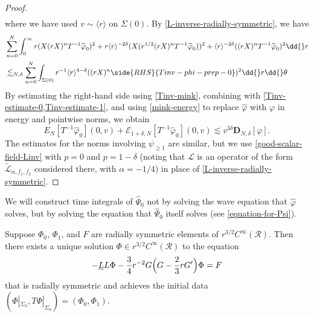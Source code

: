 \documentclass[10pt, reqno]{amsart}
\begin{document}
\begin{proof}
\begin{equation}
\begin{split}
\end{split}
\end{equation}
where we have used \(v\sim \langle{}r\rangle{}\) on \(\Sigma{}(0)\). By \cref{L-inverse-radially-symmetric}, we have
\begin{equation}\label{Tinv-Linv-prep-0}
\begin{split}
&\sum_{n=0}^N\int_0^\infty r(X(rX)^nT^{-1}\widehat{\varphi{}}_0)^2 + r\langle{}r\rangle{}^{-2\delta{}}(X(r^{1/2}(rX)^nT^{-1}\widehat{\varphi{}}_0))^2 + \langle{}r\rangle^{-2\delta{}}((rX)^nT^{-1}\widehat{\varphi{}}_0)^2 \dd{}r  \\
&\lesssim_{N,\delta{}} \sum_{n=0}^N \int _{\Sigma{}(0)} r^{-1}\langle{}r\rangle^{4-\delta{}}((rX)^n\side{RHS}{Tinv-phi-prep-0})^2\dd{}r\dd{}\theta{}
\end{split}
\end{equation}
By estimating the right-hand side using \cref{Tinv-mink}, combining with
\cref{Tinv-estimate-0,Tinv-estimate-1}, and using \cref{mink-energy} to replace
\(\widehat{\varphi{}}\) with \(\varphi{}\) in energy and pointwise norms, we obtain
\begin{equation}
E_N[T^{-1}\widehat{\varphi{}}_0](0,v) + \mathcal{E}_{1+\delta{},N}[T^{-1}\widehat{\varphi{}}_{0}](0,v) \lesssim v^{3\delta{}}\mathbf{D}_{N,\delta{}}[\varphi{}].
\end{equation}
The estimates for the norms involving \(\psi_{\ge 1}\) are similar, but we use
\cref{good-scalar-field-Linv} with \(p = 0\) and \(p = 1-\delta{}\) (noting that
\(\mathcal{L}\) is an operator of the form
\(\tilde{\mathcal{L}}_{\alpha{},f_1,f_2}\) considered there, with \(\alpha{} =
-1/4\)) in place of \cref{L-inverse-radially-symmetric}.
\end{proof}
We will construct time integrals of \(\widehat{\Psi{}}_0\) not by solving the wave
equation that \(\widehat{\varphi{}}\) solves, but by solving the equation that \(\widehat{\Psi{}}_0\) itself solves (see
\cref{equation-for-Psi}).
\begin{lemma}
Suppose \(\Phi{}_0\), \(\Phi{}_1\), and \(F\) are radially symmetric elements of \(r^{3/2}C^\infty(\mathcal{R})\). Then there exists a
unique solution \(\Phi{}\in r^{3/2}C^\infty(\mathcal{R})\) to the equation
\begin{equation}\label{Psi-equation-existence-equation}
-\underline{L}L\Phi{} - \frac{3}{4}r^{-2}G\Bigl(G - \frac{2}{3}rG'\Bigr)\Phi{} = F
\end{equation}
that is radially symmetric and achieves the initial data \((\Phi{}|_{\Sigma{}_0},T\Phi{}|_{\Sigma{}_0}) =
(\Phi{}_0,\Phi{}_1)\).
\label{Psi-equation-existence}
\end{lemma}
\end{document}
